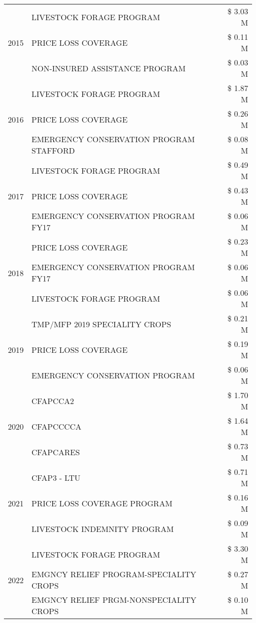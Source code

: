 \begin{tabular}{llr}
\cline{1-3}
\multirow[t]{3}{*}{2015} & LIVESTOCK FORAGE PROGRAM & \$ 3.03 M \\
 & PRICE LOSS COVERAGE & \$ 0.11 M \\
 & NON-INSURED ASSISTANCE PROGRAM & \$ 0.03 M \\
\cline{1-3}
\multirow[t]{3}{*}{2016} & LIVESTOCK FORAGE PROGRAM & \$ 1.87 M \\
 & PRICE LOSS COVERAGE & \$ 0.26 M \\
 & EMERGENCY CONSERVATION PROGRAM STAFFORD & \$ 0.08 M \\
\cline{1-3}
\multirow[t]{3}{*}{2017} & LIVESTOCK FORAGE PROGRAM & \$ 0.49 M \\
 & PRICE LOSS COVERAGE & \$ 0.43 M \\
 & EMERGENCY CONSERVATION PROGRAM FY17 & \$ 0.06 M \\
\cline{1-3}
\multirow[t]{3}{*}{2018} & PRICE LOSS COVERAGE & \$ 0.23 M \\
 & EMERGENCY CONSERVATION PROGRAM FY17 & \$ 0.06 M \\
 & LIVESTOCK FORAGE PROGRAM & \$ 0.06 M \\
\cline{1-3}
\multirow[t]{3}{*}{2019} & TMP/MFP 2019 SPECIALITY CROPS & \$ 0.21 M \\
 & PRICE LOSS COVERAGE & \$ 0.19 M \\
 & EMERGENCY CONSERVATION PROGRAM & \$ 0.06 M \\
\cline{1-3}
\multirow[t]{3}{*}{2020} & CFAPCCA2 & \$ 1.70 M \\
 & CFAPCCCCA & \$ 1.64 M \\
 & CFAPCARES & \$ 0.73 M \\
\cline{1-3}
\multirow[t]{3}{*}{2021} & CFAP3 - LTU & \$ 0.71 M \\
 & PRICE LOSS COVERAGE PROGRAM & \$ 0.16 M \\
 & LIVESTOCK INDEMNITY PROGRAM & \$ 0.09 M \\
\cline{1-3}
\multirow[t]{3}{*}{2022} & LIVESTOCK FORAGE PROGRAM & \$ 3.30 M \\
 & EMGNCY RELIEF PROGRAM-SPECIALITY CROPS & \$ 0.27 M \\
 & EMGNCY RELIEF PRGM-NONSPECIALITY CROPS & \$ 0.10 M \\
\cline{1-3}
\bottomrule
\end{tabular}
